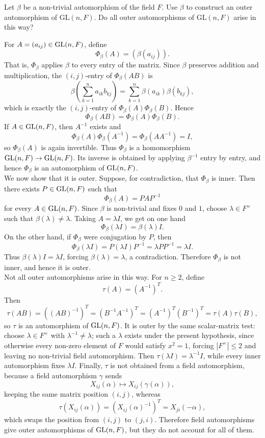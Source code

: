 \documentclass[../Odyssey_Project.tex]{subfiles}
\begin{document}
\begin{exercise}
\label{ex:4.6}
Let $\beta$ be a non-trivial automorphism of the field $F$. Use $\beta$ to construct an outer automorphism of $\mathrm{GL}(n, F)$. Do all outer automorphisms of $\mathrm{GL}(n, F)$ arise in this way?
\end{exercise}
\begin{solution}
For $A=(a_{ij})\in \operatorname{GL}(n,F)$, define
\[
    \Phi_\beta(A)=(\beta(a_{ij})).
\]
That is, $\Phi_\beta$ applies $\beta$ to every entry of the matrix. Since $\beta$ preserves addition and multiplication, the $(i,j)$-entry of $\Phi_\beta(AB)$ is
\[
    \beta\left(\sum_{k=1}^n a_{ik}b_{kj}\right)
    =
    \sum_{k=1}^n \beta(a_{ik})\beta(b_{kj}),
\]
which is exactly the $(i,j)$-entry of $\Phi_\beta(A)\Phi_\beta(B)$. Hence
\[
    \Phi_\beta(AB)=\Phi_\beta(A)\Phi_\beta(B).
\]
If $A\in \operatorname{GL}(n,F)$, then $A^{-1}$ exists and
\[
    \Phi_\beta(A)\Phi_\beta(A^{-1})
    =
    \Phi_\beta(AA^{-1})
    =
    I,
\]
so $\Phi_\beta(A)$ is again invertible. Thus $\Phi_\beta$ is a homomorphism $\operatorname{GL}(n,F)\to \operatorname{GL}(n,F)$. Its inverse is obtained by applying $\beta^{-1}$ entry by entry, and hence $\Phi_\beta$ is an automorphism of $\operatorname{GL}(n,F)$.\\
We now show that it is outer. Suppose, for contradiction, that $\Phi_\beta$ is inner. Then there exists $P\in \operatorname{GL}(n,F)$ such that
\[
    \Phi_\beta(A)=PAP^{-1}
\]
for every $A\in \operatorname{GL}(n,F)$. Since $\beta$ is non-trivial and fixes $0$ and $1$, choose $\lambda\in F^\times$ such that $\beta(\lambda)\neq \lambda$. Taking $A=\lambda I$, we get on one hand
\[
    \Phi_\beta(\lambda I)=\beta(\lambda)I.
\]
On the other hand, if $\Phi_\beta$ were conjugation by $P$, then
\[
    \Phi_\beta(\lambda I)
    =
    P(\lambda I)P^{-1}
    =
    \lambda PP^{-1}
    =
    \lambda I.
\]
Thus $\beta(\lambda)I=\lambda I$, forcing $\beta(\lambda)=\lambda$, a contradiction. Therefore $\Phi_\beta$ is not inner, and hence it is outer.\\
Not all outer automorphisms arise in this way. For $n\geq 2$, define
\[
    \tau(A)=(A^{-1})^T.
\]
Then
\[
    \tau(AB)
    =
    ((AB)^{-1})^T
    =
    (B^{-1}A^{-1})^T
    =
    (A^{-1})^T(B^{-1})^T
    =
    \tau(A)\tau(B),
\]
so $\tau$ is an automorphism of $\operatorname{GL}(n,F)$. It is outer by the same scalar-matrix test: choose $\lambda\in F^\times$ with $\lambda^{-1}\neq\lambda$; such a $\lambda$ exists under the present hypothesis, since otherwise every non-zero element of $F$ would satisfy $x^2=1$, forcing $|F^\times|\leq 2$ and leaving no non-trivial field automorphism. Then $\tau(\lambda I)=\lambda^{-1}I$, while every inner automorphism fixes $\lambda I$. Finally, $\tau$ is not obtained from a field automorphism, because a field automorphism $\gamma$ sends
\[
    X_{ij}(\alpha)\mapsto X_{ij}(\gamma(\alpha)),
\]
keeping the same matrix position $(i,j)$, whereas
\[
    \tau(X_{ij}(\alpha))
    =
    (X_{ij}(\alpha)^{-1})^T
    =
    X_{ji}(-\alpha),
\]
which swaps the position from $(i,j)$ to $(j,i)$. Therefore field automorphisms give outer automorphisms of $\operatorname{GL}(n,F)$, but they do not account for all of them.
\end{solution}
\end{document}
